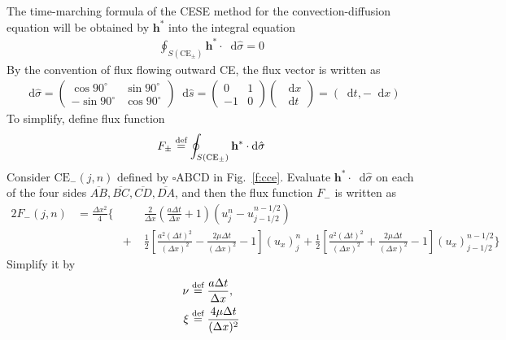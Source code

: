 \documentclass[11pt,dvips]{article}
\numberwithin{equation}{section}
\newcommand{\defeq}{\ensuremath{\buildrel {\text{def}}\over{=}}}
\newcommand{\dif}{\mathop{}\!\mathrm{d}}
\begin{document}
The time-marching formula of the CESE method for the convection-diffusion
equation will be obtained by $\mathbf{h}^*$ into the integral equation
\begin{align*}
  \oint_{S(\mathrm{CE}_{\pm})}\mathbf{h}^*\cdot \dif\hat{\sigma}=0
\end{align*}
By the convention of flux flowing outward CE, the flux vector is written as
\begin{align*}
  \dif\hat{\sigma}
  = \left(\begin{array}{cc} \cos90^{\circ} & \sin90^{\circ} \\
                           -\sin90^{\circ} & \cos90^{\circ}
    \end{array}\right) \dif\hat{s}
  = \left(\begin{array}{cc} 0 & 1 \\
                           -1 & 0
    \end{array}\right)
    \left(\begin{array}{c} \dif x \\ \dif t
    \end{array}\right)
  = (\dif t, -\dif x)
\end{align*}
To simplify, define flux function
\begin{align*}
  F_{\pm} \defeq
    \oint_{S(\mathrm{CE}_{\pm})}\mathbf{h}^*\cdot \dif\hat{\sigma}
\end{align*}
Consider $\mathrm{CE}_-(j,n)$ defined by $\square\mathrm{ABCD}$ in
Fig.~\ref{f:cce}.  Evaluate $\mathbf{h}^*\cdot \dif\hat{\sigma}$ on each of the
four sides $\overline{AB}, \overline{BC}, \overline{CD}, \overline{DA}$,
and then the flux function $F_-$ is written as
\begin{alignat*}{2}
  F_-(j,n) &= \frac{\Delta x^2}{4}\Big\{
    &&\frac{2}{\Delta x}\left(\frac{a\Delta t}{\Delta x}+1\right)
      \left(u_j^n-u_{j-1/2}^{n-1/2}\right) \\
  & &+\;& \frac{1}{2}\left[
          \frac{a^2(\Delta t)^2}{(\Delta x)^2}
        - \frac{2\mu\Delta t} {(\Delta x)^2} - 1
        \right](u_x)_j^n
    +     \frac{1}{2}\left[
          \frac{a^2(\Delta t)^2}{(\Delta x)^2}
        + \frac{2\mu\Delta t} {(\Delta x)^2} - 1
        \right](u_x)_{j-1/2}^{n-1/2}
    \Big\}
\end{alignat*}
Simplify it by
\begin{align}
  \nu &\defeq \frac{a\Delta t}{\Delta x}, \label{e:nu} \\
  \xi &\defeq \frac{4\mu\Delta t}{(\Delta x)^2} \label{e:xi}
\end{align}
\end{document}
